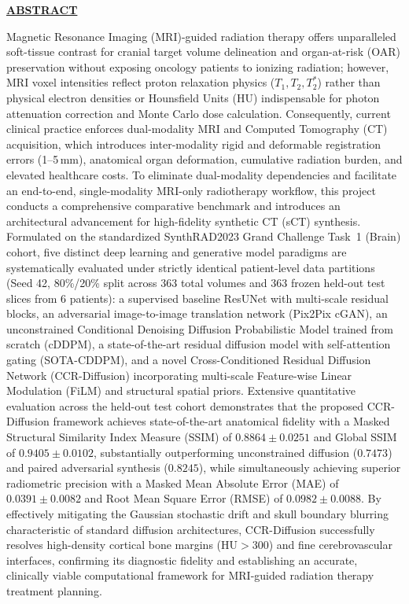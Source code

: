 \documentclass[12pt,a4paper]{report}
\begin{document}
\newpage
\begin{center}
{\fontsize{16}{20}\selectfont\bfseries\underline{ABSTRACT}}
\end{center}
\vspace{15pt}
Magnetic Resonance Imaging (MRI)-guided radiation therapy offers unparalleled soft-tissue contrast for cranial target volume delineation and organ-at-risk (OAR) preservation without exposing oncology patients to ionizing radiation; however, MRI voxel intensities reflect proton relaxation physics ($T_1, T_2, T_2^*$) rather than physical electron densities or Hounsfield Units (HU) indispensable for photon attenuation correction and Monte Carlo dose calculation. Consequently, current clinical practice enforces dual-modality MRI and Computed Tomography (CT) acquisition, which introduces inter-modality rigid and deformable registration errors (1--5\,mm), anatomical organ deformation, cumulative radiation burden, and elevated healthcare costs. To eliminate dual-modality dependencies and facilitate an end-to-end, single-modality MRI-only radiotherapy workflow, this project conducts a comprehensive comparative benchmark and introduces an architectural advancement for high-fidelity synthetic CT (sCT) synthesis. Formulated on the standardized SynthRAD2023 Grand Challenge Task~1 (Brain) cohort, five distinct deep learning and generative model paradigms are systematically evaluated under strictly identical patient-level data partitions (Seed 42, 80\%/20\% split across 363 total volumes and 363 frozen held-out test slices from 6 patients): a supervised baseline ResUNet with multi-scale residual blocks, an adversarial image-to-image translation network (Pix2Pix cGAN), an unconstrained Conditional Denoising Diffusion Probabilistic Model trained from scratch (cDDPM), a state-of-the-art residual diffusion model with self-attention gating (SOTA-CDDPM), and a novel Cross-Conditioned Residual Diffusion Network (CCR-Diffusion) incorporating multi-scale Feature-wise Linear Modulation (FiLM) and structural spatial priors. Extensive quantitative evaluation across the held-out test cohort demonstrates that the proposed CCR-Diffusion framework achieves state-of-the-art anatomical fidelity with a Masked Structural Similarity Index Measure (SSIM) of $0.8864 \pm 0.0251$ and Global SSIM of $0.9405 \pm 0.0102$, substantially outperforming unconstrained diffusion ($0.7473$) and paired adversarial synthesis ($0.8245$), while simultaneously achieving superior radiometric precision with a Masked Mean Absolute Error (MAE) of $0.0391 \pm 0.0082$ and Root Mean Square Error (RMSE) of $0.0982 \pm 0.0088$. By effectively mitigating the Gaussian stochastic drift and skull boundary blurring characteristic of standard diffusion architectures, CCR-Diffusion successfully resolves high-density cortical bone margins ($\text{HU} > 300$) and fine cerebrovascular interfaces, confirming its diagnostic fidelity and establishing an accurate, clinically viable computational framework for MRI-guided radiation therapy treatment planning.
\end{document}
